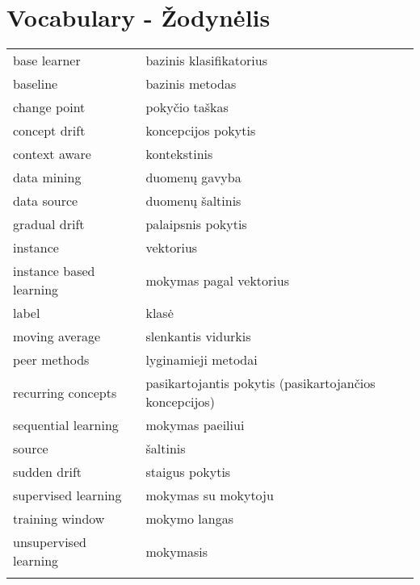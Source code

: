 \chapter*{Vocabulary - \v{Z}odyn\.elis}
\label{cha:vocabulary}
	

\noindent
 \begin{longtable}[l]{ p{4cm} p{7cm} } %
    base learner   &  bazinis klasifikatorius \\
    baseline       &  bazinis metodas \\
    change point   &  poky\v{c}io ta\v{s}kas  \\
    concept drift  &  koncepcijos pokytis \\
    context aware  &  kontekstinis  \\
    data mining    &  duomen\k{u} gavyba \\ 
    data source    &  duomen\k{u} \v{s}altinis \\
    gradual drift  &  palaipsnis pokytis  \\
    instance       &  vektorius \\
    instance based learning &  mokymas pagal vektorius \\ 
    label          &  klas\.e \\
    moving average &  slenkantis vidurkis \\ 
    peer methods   &  lyginamieji metodai  \\
    recurring concepts  &  pasikartojantis pokytis (pasikartojan\v{c}ios koncepcijos)  \\
    sequential learning &  mokymas paeiliui  \\
    source         &  \v{s}altinis  \\
    sudden drift   &  staigus pokytis  \\
    supervised learning   &  mokymas su mokytoju  \\
    training window       &  mokymo langas  \\
    unsupervised learning &  mokymasis  \\
    \label{tab:vocabulary}
\end{longtable}

